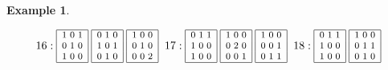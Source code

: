 \documentclass[12pt]{article}
\theoremstyle{definition}
\newtheorem{Example}[Theorem]{Example}
\begin{document}
\begin{Example}
\[{\begin{array}{|c|}
\end{array}
}\]
\[{\footnotesize
16: 
\begin{array}{|c|}\hline
1\ 0\ 1\\ 0\ 1\ 0\\ 1\ 0\ 0\\ \hline
\end{array}
\hspace*{1mm}
\begin{array}{|c|}\hline
0\ 1\ 0\\ 1\ 0\ 1\\ 0\ 1\ 0\\ \hline
\end{array}
\hspace*{1mm}
\begin{array}{|c|}\hline
1\ 0\ 0\\ 0\ 1\ 0\\ 0\ 0\ 2\\ \hline
\end{array}
\hspace*{2mm}
17: 
\begin{array}{|c|}\hline
0\ 1\ 1\\ 1\ 0\ 0\\ 1\ 0\ 0\\ \hline
\end{array}
\hspace*{1mm}
\begin{array}{|c|}\hline
1\ 0\ 0\\ 0\ 2\ 0\\ 0\ 0\ 1\\ \hline
\end{array}
\hspace*{1mm}
\begin{array}{|c|}\hline
1\ 0\ 0\\ 0\ 0\ 1\\ 0\ 1\ 1\\ \hline
\end{array}
\hspace*{2mm}
18: 
\begin{array}{|c|}\hline
0\ 1\ 1\\ 1\ 0\ 0\\ 1\ 0\ 0\\ \hline
\end{array}
\hspace*{1mm}
\begin{array}{|c|}\hline
1\ 0\ 0\\ 0\ 1\ 1\\ 0\ 1\ 0\\ \hline

\end{array}}\]
\end{Example}
\end{document}
